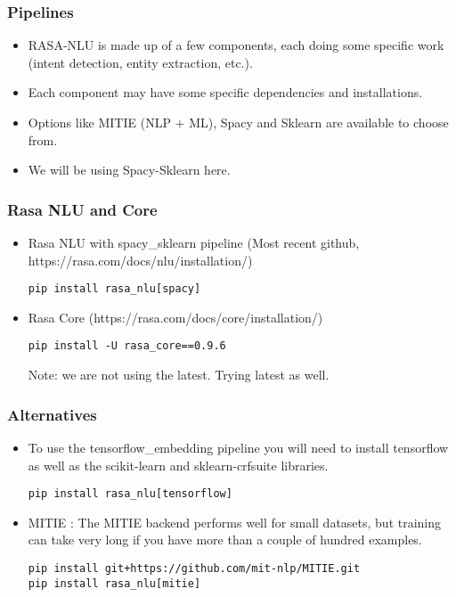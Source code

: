  \begin{frame}[fragile]\frametitle{Pipelines}
\begin{itemize}
\item RASA-NLU is made up of a few components, each doing some specific work (intent detection, entity extraction, etc.). 
\item Each component may have some specific dependencies and installations. 
\item Options like MITIE (NLP + ML), Spacy and Sklearn are available to choose from. 
\item We will be using Spacy-Sklearn here.
\end{itemize}

\end{frame}
 \begin{frame}[fragile]\frametitle{Rasa NLU and Core}
\begin{itemize}
\item Rasa NLU  with spacy\_sklearn pipeline (Most recent github, https://rasa.com/docs/nlu/installation/)
\begin{lstlisting}
pip install rasa_nlu[spacy]
\end{lstlisting}
\item Rasa Core (https://rasa.com/docs/core/installation/)
\begin{lstlisting}
pip install -U rasa_core==0.9.6
\end{lstlisting}
Note: we are not using the latest. Trying latest as well.
\end{itemize}
\end{frame}

 \begin{frame}[fragile]\frametitle{Alternatives}
\begin{itemize}
\item To use the tensorflow\_embedding pipeline you will need to install tensorflow as well as the scikit-learn and sklearn-crfsuite libraries. 
\begin{lstlisting}
pip install rasa_nlu[tensorflow]
\end{lstlisting}
\item MITIE : The MITIE backend performs well for small datasets, but training can take very long if you have more than a couple of hundred examples.
\begin{lstlisting}
pip install git+https://github.com/mit-nlp/MITIE.git
pip install rasa_nlu[mitie]
\end{lstlisting}
\end{itemize}

\end{frame}

